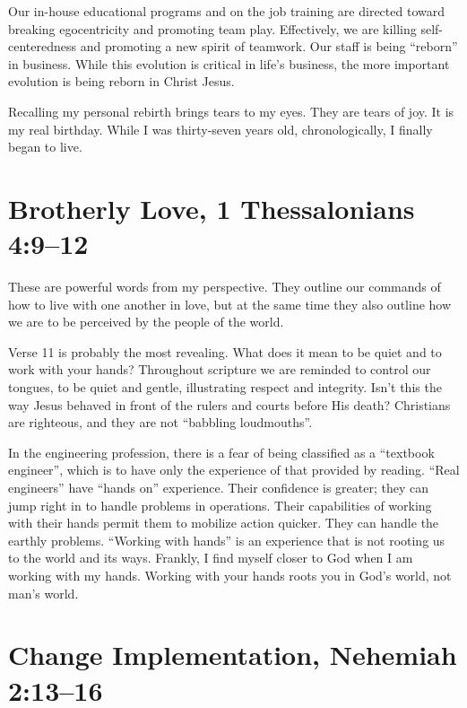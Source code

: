 \documentclass[12pt]{memoir}
\begin{document}
Our in-house educational programs and on the job training are directed
toward breaking egocentricity and promoting team play.
Effectively, we are killing self-centeredness and promoting a new spirit of teamwork.
Our staff is being ``reborn'' in business.
While this evolution is critical in life's business, the more important evolution is being reborn in Christ Jesus.

Recalling my personal rebirth brings tears to my eyes.
They are tears of joy.
It is my real birthday. While I was thirty-seven years old, chronologically, I finally began to live.

\section[Brotherly Love]{Brotherly Love, 1 Thessalonians 4:9--12}

These are powerful words from my perspective. They outline our commands of how to live with one another in love, but at the same time they
also outline how we are to be perceived by the people of the world.

Verse 11 is probably the most revealing. What does it mean to be
quiet and to work with your hands? Throughout scripture we
are reminded to control our tongues, to be quiet and gentle,
illustrating respect and integrity.
Isn't this the way Jesus behaved
in front of the rulers and courts before His death? Christians are
righteous, and they are not ``babbling loudmouths''.

In the engineering profession, there is a fear of being classified
as a ``textbook engineer'', which is to have only the experience
of that provided by reading. ``Real engineers'' have ``hands on''
experience. Their confidence is greater; they can jump right in to
handle problems in operations. Their capabilities of working with
their hands permit them to mobilize action quicker. They can handle
the earthly problems. ``Working with hands'' is an experience that
is not rooting us to the world and its ways. Frankly, I find myself
closer to God when I am working with my hands. Working with your hands
roots you in God's world, not man's world.

\section[Change Implementation]{Change Implementation, Nehemiah 2:13--16}
\end{document}
